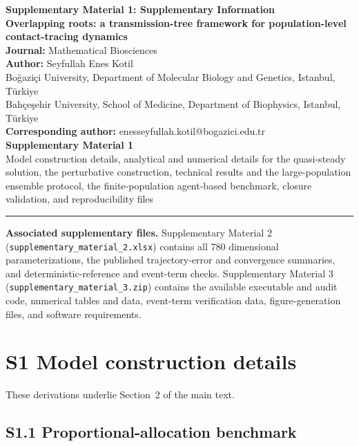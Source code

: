 \documentclass[11pt]{article}
\begin{document}
\begin{center}
{\Large\bfseries Supplementary Material 1: Supplementary Information}\\[1.0em]
{\large\bfseries Overlapping roots: a transmission-tree framework for population-level contact-tracing dynamics}\\[1.2em]
{\bfseries Journal:} Mathematical Biosciences\\[0.5em]
{\bfseries Author:} Seyfullah Enes Kotil\\[0.4em]
Boğaziçi University, Department of Molecular Biology and Genetics, Istanbul, Türkiye\\
Bahçeşehir University, School of Medicine, Department of Biophysics, Istanbul, Türkiye\\[0.5em]
{\bfseries Corresponding author:} enesseyfullah.kotil@bogazici.edu.tr\\[1.2em]
{\bfseries Supplementary Material 1}\\
Model construction details, analytical and numerical details for the quasi-steady solution, the perturbative construction, technical results and the large-population ensemble protocol, the finite-population agent-based benchmark, closure validation, and reproducibility files
\end{center}
\vspace{0.5em}\hrule\vspace{1em}

\textbf{Associated supplementary files.} Supplementary Material 2 (\texttt{supplementary\_material\_2.xlsx}) contains all 780 dimensional parameterizations, the published trajectory-error and convergence summaries, and deterministic-reference and event-term checks. Supplementary Material 3 (\texttt{supplementary\_material\_3.zip}) contains the available executable and audit code, numerical tables and data, event-term verification data, figure-generation files, and software requirements.

\section*{S1 Model construction details}
These derivations underlie Section~2 of the main text.

\subsection*{S1.1 Proportional-allocation benchmark}
\end{document}
